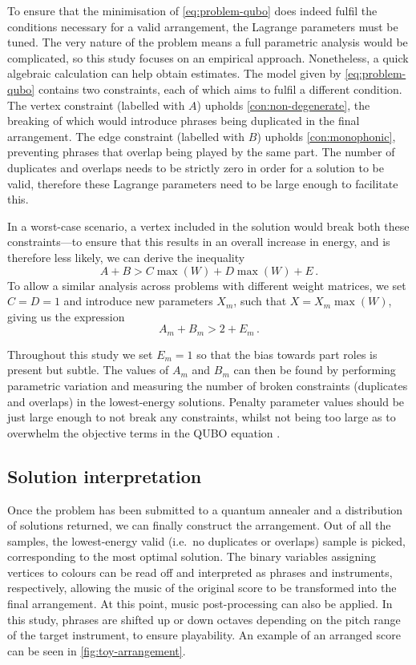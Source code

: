 \documentclass[twocolumn]{article}
\theoremstyle{definition}
\begin{document}
To ensure that the minimisation of \cref{eq:problem-qubo} does indeed fulfil the conditions necessary for a valid arrangement, the Lagrange parameters must be tuned. The very nature of the problem means a full parametric analysis would be complicated, so this study focuses on an empirical approach.
Nonetheless, a quick algebraic calculation can help obtain estimates. The model given by \cref{eq:problem-qubo} contains two constraints, each of which aims to fulfil a different condition. The vertex constraint (labelled with $A$) upholds \cref{con:non-degenerate}, the breaking of which would introduce phrases being duplicated in the final arrangement. The edge constraint (labelled with $B$) upholds \cref{con:monophonic}, preventing phrases that overlap being played by the same part. The number of duplicates and overlaps needs to be strictly zero in order for a solution to be valid, therefore these Lagrange parameters need to be large enough to facilitate this.

In a worst-case scenario, a vertex included in the solution would break both these constraints---to ensure that this results in an overall increase in energy, and is therefore less likely, we can derive the inequality
\begin{equation}
    A + B > C\max(W) + D\max(W) + E \,.
\end{equation}
To allow a similar analysis across problems with different weight matrices, we set ${C=D=1}$ and introduce new parameters $X_m$, such that ${X = X_m\max(W)}$, giving us the expression
\begin{equation}
    A_m + B_m > 2 + E_m \,.
    \label{eq:lagrange}
\end{equation}

Throughout this study we set $E_m=1$ so that the bias towards part roles is present but subtle. The values of $A_m$ and $B_m$ can then be found by performing parametric variation and measuring the number of broken constraints (duplicates and overlaps) in the lowest-energy solutions. Penalty parameter values should be just large enough to not break any constraints, whilst not being too large as to overwhelm the objective terms in the QUBO equation \cite{au-yeung_np-hard_2023}.

\subsection{Solution interpretation}

Once the problem has been submitted to a quantum annealer and a distribution of solutions returned, we can finally construct the arrangement. Out of all the samples, the lowest-energy valid (i.e.\ no duplicates or overlaps) sample is picked, corresponding to the most optimal solution. The binary variables assigning vertices to colours can be read off and interpreted as phrases and instruments, respectively, allowing the music of the original score to be transformed into the final arrangement.
At this point, music post-processing can also be applied. In this study, phrases are shifted up or down octaves depending on the pitch range of the target instrument, to ensure playability. An example of an arranged score can be seen in \cref{fig:toy-arrangement}.
\end{document}
